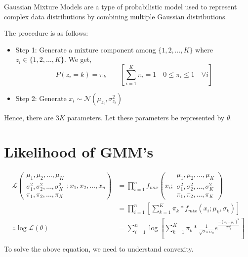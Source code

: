 \documentclass[
]{article}
\providecommand{\tightlist}{%
  \setlength{\itemsep}{0pt}\setlength{\parskip}{0pt}}
\begin{document}
Gaussian Mixture Models are a type of probabilistic model used to
represent complex data distributions by combining multiple Gaussian
distributions.

The procedure is as follows:

\begin{itemize}
\tightlist
\item
  Step 1: Generate a mixture component among \(\{1, 2, \ldots, K\}\)
  where \(z_i \in \{1, 2, \ldots, K\}\). We get, \[
  P(z_i=k) = \pi_k \hspace{2em} \left [ \sum _{i=1} ^K \pi_i = 1 \hspace{1em} 0 \le \pi_i \le 1 \hspace{1em} \forall i \right ]
  \]
\item
  Step 2: Generate \(x_i \sim \mathcal{N}(\mu_{z_i}, \sigma^2_{z_i})\)
\end{itemize}

Hence, there are \(3K\) parameters. Let these parameters be represented
by \(\theta\).

\hypertarget{likelihood-of-gmms}{%
\section{Likelihood of GMM's}\label{likelihood-of-gmms}}

\begin{align*}
\mathcal{L}\left( \begin{array}{cccc}
\mu_1, \mu_2, \ldots, \mu_K \\
\sigma^2_1, \sigma^2_2, \ldots, \sigma^2_K\\
\pi_1, \pi_2, \ldots, \pi_K
\end{array}; x_1, x_2, \ldots, x_n \right )
&= \prod _{i=1} ^n f_{mix} \left( x_i; \begin{array}{cccc}
\mu_1, \mu_2, \ldots, \mu_K \\
\sigma^2_1, \sigma^2_2, \ldots, \sigma^2_K\\
\pi_1, \pi_2, \ldots, \pi_K
\end{array} \right ) \\
&= \prod _{i=1} ^n \left [ \sum _{k=1} ^K \pi_k * f_{mix}(x_i; \mu_k, \sigma_k) \right ] \\
\therefore \log\mathcal{L}(\theta) &= \sum _{i=1} ^n \log \left [ \sum _{k=1} ^K \pi_k * \frac{1}{\sqrt{2\pi}\sigma_k} e^{\frac{-(x_i-\mu_k)^2}{2\sigma^2_k}} \right ] \\
\end{align*} To solve the above equation, we need to understand
convexity.
\end{document}
